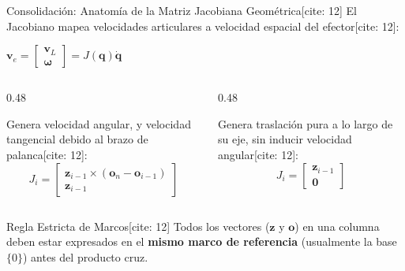\documentclass[aspectratio=169, xcolor={table,xcdraw}]{beamer}
\begin{document}
\begin{frame}{Consolidación: Anatomía de la Matriz Jacobiana Geométrica[cite: 12]}
    El Jacobiano mapea velocidades articulares a velocidad espacial del efector[cite: 12]:
    \begin{center}
        $\mathbf{v}_e = \begin{bmatrix} \mathbf{v}_L \\ \boldsymbol{\omega} \end{bmatrix} = J(\mathbf{q})\dot{\mathbf{q}}$
    \end{center}

    \begin{columns}[T]
        \begin{column}{0.48\textwidth}
            \begin{tcolorbox}[colback=ucbblue!5, colframe=ucbblue, title=Junta Revoluta $i$, left=1mm, right=1mm, top=1mm, bottom=1mm]
                \small
                Genera velocidad angular, y velocidad tangencial debido al brazo de palanca[cite: 12]:
                \begin{equation*}
                    J_i = \begin{bmatrix} \mathbf{z}_{i-1} \times (\mathbf{o}_n - \mathbf{o}_{i-1}) \\ \mathbf{z}_{i-1} \end{bmatrix}
                \end{equation*}
            \end{tcolorbox}
        \end{column}
        \begin{column}{0.48\textwidth}
            \begin{tcolorbox}[colback=red!5, colframe=red!70!black, title=Junta Prismática $i$, left=1mm, right=1mm, top=1mm, bottom=1mm]
                \small
                Genera traslación pura a lo largo de su eje, sin inducir velocidad angular[cite: 12]:
                \begin{equation*}
                    J_i = \begin{bmatrix} \mathbf{z}_{i-1} \\ \mathbf{0} \end{bmatrix}
                \end{equation*}
            \end{tcolorbox}
        \end{column}
    \end{columns}
    
    \vfill
    \begin{alertblock}{Regla Estricta de Marcos[cite: 12]}
        \small Todos los vectores ($\mathbf{z}$ y $\mathbf{o}$) en una columna deben estar expresados en el \textbf{mismo marco de referencia} (usualmente la base $\{0\}$) antes del producto cruz.
    \end{alertblock}
\end{frame}
\end{document}
